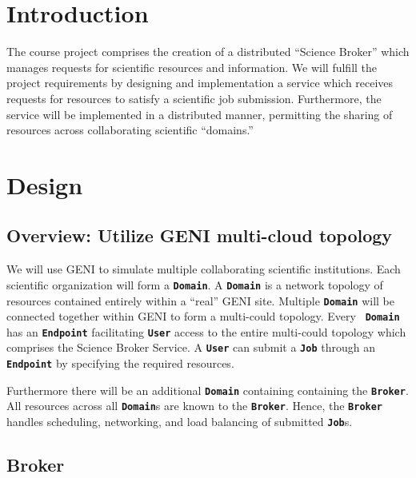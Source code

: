 \documentclass{ReportCUNY}
\newcommand{\KeyWord}[1]{\textbf{\texttt{#1}}}
\begin{document}
\setlength{\belowdisplayskip}{0pt} \setlength{\belowdisplayshortskip}{1pt}
\setlength{\abovedisplayskip}{0pt} \setlength{\abovedisplayshortskip}{1pt}
\setlength{\abovedisplayskip}{5pt}
\setlength{\belowdisplayskip}{5pt}

\section{Introduction}

The course project comprises the creation of a distributed ``Science Broker'' which manages requests for scientific resources and information.
We will fulfill the project requirements by designing and implementation a service which receives requests for resources to satisfy a scientific job submission.
Furthermore, the service will be implemented in a distributed manner, permitting the sharing of resources across collaborating scientific ``domains.''


\section{Design}

\subsection{Overview: Utilize GENI multi-cloud topology}

We will use GENI to simulate multiple collaborating scientific institutions.
Each scientific organization will form a \KeyWord{Domain}.
A \KeyWord{Domain} is a network topology of resources contained entirely within a ``real'' GENI site.
Multiple \KeyWord{Domain} will be connected together within GENI to form a multi-could topology.
Every \ \KeyWord{Domain} has an \KeyWord{Endpoint} facilitating \KeyWord{User} access to the entire multi-could topology which comprises the Science Broker Service.
A \KeyWord{User} can submit a \KeyWord{Job} through an \KeyWord{Endpoint} by specifying the required resources.

Furthermore there will be an additional \KeyWord{Domain} containing containing the \KeyWord{Broker}.
All resources across all \KeyWord{Domain}s are known to the \KeyWord{Broker}.
Hence, the \KeyWord{Broker} handles scheduling, networking, and load balancing of submitted \KeyWord{Job}s.


\subsection{Broker}
\end{document}
